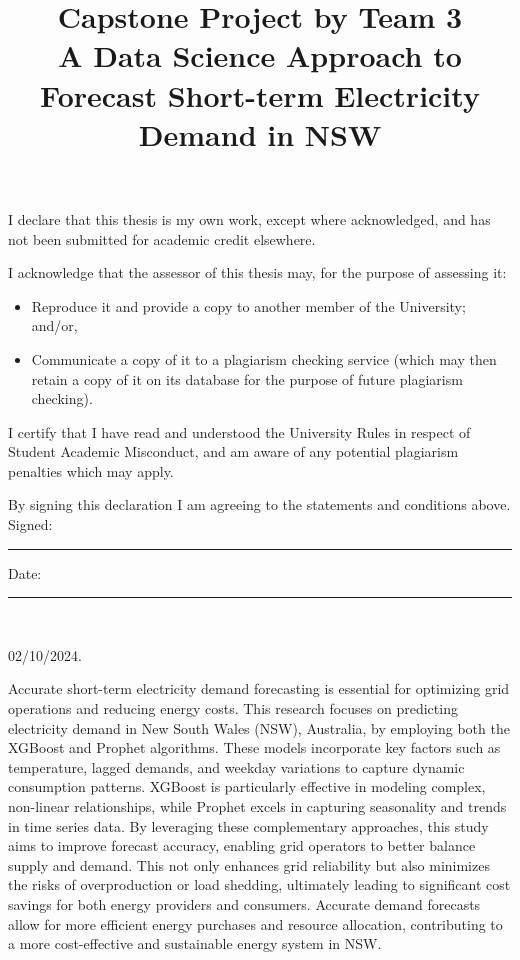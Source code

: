 \documentclass[mstat,12pt]{unswthesis}
\title{Capstone Project by Team 3\\[0.5cm]A Data Science Approach to
Forecast Short-term Electricity Demand in NSW}
\author{\Authornameonly}
\begin{document}
\beforepreface




\vskip 2pc \noindent I declare that this thesis is my
own work, except where acknowledged, and has not been submitted for
academic credit elsewhere. 

\vskip 2pc  \noindent I acknowledge that the assessor of this
thesis may, for the purpose of assessing it:
\begin{itemize}
\item Reproduce it and provide a copy to another member of the University; and/or,
\item Communicate a copy of it to a plagiarism checking service (which may then retain a copy of it on its database for the purpose of future plagiarism checking).
\end{itemize}

\vskip 2pc \noindent I certify that I have read and understood the University Rules in
respect of Student Academic Misconduct, and am aware of any potential plagiarism penalties which may 
apply.\vspace{24pt}

\vskip 2pc \noindent By signing 
this declaration I am
agreeing to the statements and conditions above.
\vskip 2pc \noindent
Signed: \rule{7cm}{0.25pt} \hfill Date: \rule{4cm}{0.25pt} \\[1cm]
\vskip 1pc






{\bigskip\bigskip\bigskip\noindent} 02/10/2024.




Accurate short-term electricity demand forecasting is essential for
optimizing grid operations and reducing energy costs. This research
focuses on predicting electricity demand in New South Wales (NSW),
Australia, by employing both the XGBoost and Prophet algorithms. These
models incorporate key factors such as temperature, lagged demands, and
weekday variations to capture dynamic consumption patterns. XGBoost is
particularly effective in modeling complex, non-linear relationships,
while Prophet excels in capturing seasonality and trends in time series
data. By leveraging these complementary approaches, this study aims to
improve forecast accuracy, enabling grid operators to better balance
supply and demand. This not only enhances grid reliability but also
minimizes the risks of overproduction or load shedding, ultimately
leading to significant cost savings for both energy providers and
consumers. Accurate demand forecasts allow for more efficient energy
purchases and resource allocation, contributing to a more cost-effective
and sustainable energy system in NSW.
\end{document}
